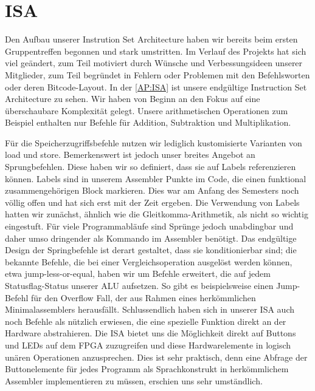 
\section{ISA}
Den Aufbau unserer Instrution Set Architecture haben wir bereits beim ersten Gruppentreffen begonnen und stark umstritten. Im Verlauf des Projekts hat sich viel geändert, zum Teil motiviert durch Wünsche und Verbessungsideen unserer Mitglieder, zum Teil begründet in Fehlern oder Problemen mit den Befehlsworten oder deren Bitcode-Layout.
In der \autoref{AP:ISA} ist unsere endgültige Instruction Set Architecture zu sehen. Wir haben von Beginn an den Fokus auf eine überschaubare Komplexität gelegt. Unsere arithmetischen Operationen zum Beispiel enthalten nur Befehle für Addition, Subtraktion und Multiplikation. 

Für die Speicherzugriffsbefehle nutzen wir lediglich kustomisierte Varianten von load und store. Bemerkenswert ist jedoch unser breites Angebot an Sprungbefehlen. Diese haben wir so definiert, dass sie auf Labels referenzieren können.  Labels sind in unserem Assembler Punkte im Code, die einen funktional zusammengehörigen Block markieren. Dies war am Anfang des Semesters noch völlig offen und hat sich erst mit der Zeit ergeben. Die Verwendung von Labels hatten wir zunächst, ähnlich wie die Gleitkomma-Arithmetik, als nicht so wichtig eingestuft. Für viele Programmabläufe sind Sprünge jedoch unabdingbar und daher umso dringender als Kommando im Assembler benötigt. Das endgültige Design der Springbefehle ist derart gestaltet, dass sie konditionierbar sind; die bekannte Befehle, die bei einer Vergleichsoperation ausgelöst werden können, etwa jump-less-or-equal, haben wir um Befehle erweitert, die auf jedem Statusflag-Status unserer ALU aufsetzen. So gibt es beispielsweise einen Jump-Befehl für den Overflow Fall, der aus Rahmen eines herkömmlichen Minimalassemblers herausfällt.
Schlussendlich haben sich in unserer ISA auch noch Befehle als nützlich erwiesen, die eine spezielle Funktion direkt an der Hardware abstrahieren. Die ISA bietet uns die Möglichkeit direkt auf Buttons und LEDs auf dem FPGA zuzugreifen und diese Hardwarelemente in logisch unären Operationen anzusprechen. Dies ist sehr praktisch, denn eine Abfrage der Buttonelemente für jedes Programm als Sprachkonstrukt in herkömmlichem Assembler implementieren zu müssen, erschien uns sehr umständlich.

